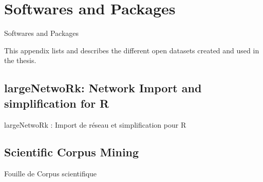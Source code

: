 \chapter{Softwares and Packages}{Softwares and Packages} %

\label{app:packages} %



\headercit{}{}{}



This appendix lists and describes the different open datasets created and used in the thesis.


\section{largeNetwoRk: Network Import and simplification for R}{largeNetwoRk : Import de réseau et simplification pour R}



\section{Scientific Corpus Mining}{Fouille de Corpus scientifique}
